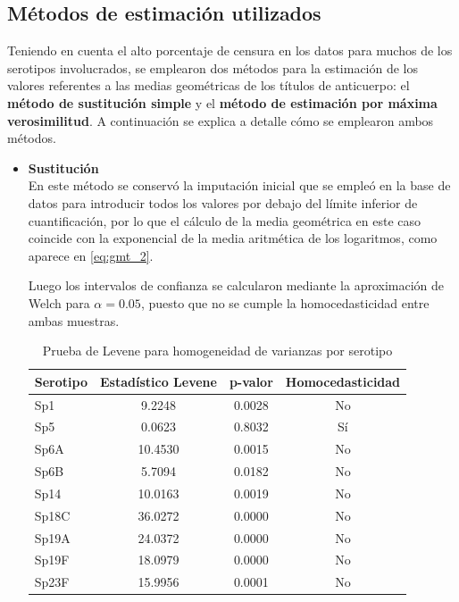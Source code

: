 \subsection{Métodos de estimación utilizados}\label{sec:Métodos_de_estimación_utilizados}

Teniendo en cuenta el alto porcentaje de censura en los datos para muchos de los serotipos involucrados, se emplearon dos métodos para la estimación de los valores referentes a las medias geométricas de los títulos de anticuerpo: el \textbf{método de sustitución simple} y el \textbf{método de estimación por máxima verosimilitud}. A continuación se explica a detalle cómo se emplearon ambos métodos.

\begin{itemize}
	\item \textbf{Sustitución}\\
	En este método se conservó la imputación inicial que se empleó en la base de datos para introducir todos los valores por debajo del límite inferior de cuantificación, por lo que el cálculo de la media geométrica en este caso coincide con la exponencial de la media aritmética de los logaritmos, como aparece en \ref{eq:gmt_2}.
	
	Luego los intervalos de confianza se calcularon mediante la aproximación de Welch para $\alpha = 0.05$, puesto que no se cumple la homocedasticidad entre ambas muestras.
	
	\begin{table}[ht]
		\centering
		\caption{Prueba de Levene para homogeneidad de varianzas por serotipo}
		\label{tab:levene}
		\begin{tabular}{lccc}
			\toprule
			Serotipo & Estadístico Levene & p-valor & Homocedasticidad \\
			\midrule
			Sp1   & 9.2248  & 0.0028 & No \\
			Sp5   & 0.0623  & 0.8032 & Sí \\
			Sp6A  & 10.4530 & 0.0015 & No \\
			Sp6B  & 5.7094  & 0.0182 & No \\
			Sp14  & 10.0163 & 0.0019 & No \\
			Sp18C & 36.0272 & 0.0000 & No \\
			Sp19A & 24.0372 & 0.0000 & No \\
			Sp19F & 18.0979 & 0.0000 & No \\
			Sp23F & 15.9956 & 0.0001 & No \\
			\bottomrule
		\end{tabular}
	\end{table}
	

\end{itemize}
